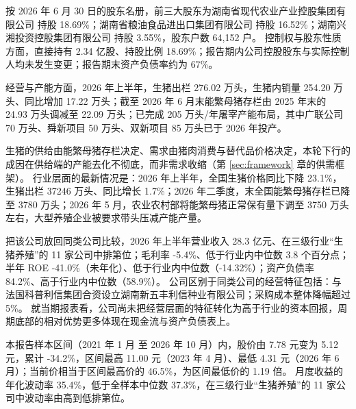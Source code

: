  按 2026 年 6 月 30 日的股东名册，前三大股东为湖南省现代农业产业控股集团有限公司 持股 18.69\%；湖南省粮油食品进出口集团有限公司 持股 16.52\%；湖南兴湘投资控股集团有限公司 持股 3.55\%，股东户数 64,152 户。 控制权与股东性质方面，直接持有 2.34 亿股、持股比例 18.69\%；报告期内公司控股股东与实际控制人均未发生变更；报告期末资产负债率约为 67\%。

 经营与产能方面，2026 年上半年，生猪出栏 276.02 万头，生猪内销量 254.20 万头、同比增加 17.22 万头；截至 2026 年 6 月末能繁母猪存栏由 2025 年末的 24.93 万头调减至 22.09 万头；已完成 205 万头/年屠宰产能布局，其中广联公司 70 万头、舜新项目 50 万头、双新项目 85 万头已于 2026 年投产。

 生猪的供给由能繁母猪存栏决定、需求由猪肉消费与替代品价格决定，本轮下行的成因在供给端的产能去化不彻底，而非需求收缩（第 \ref{sec:framework} 章的供需框架）。 行业层面的最新情况是：2026 年上半年，全国生猪价格同比下降 23.1\%，生猪出栏 37246 万头、同比增长 1.7\%；2026 年二季度，末全国能繁母猪存栏已降至 3780 万头；2026 年 5 月，农业农村部将能繁母猪正常保有量下调至 3750 万头左右，大型养殖企业被要求带头压减产能产量。

 把该公司放回同类公司比较，2026 年上半年营业收入 28.3 亿元、在三级行业“生猪养殖”的 11 家公司中排第位；毛利率 -5.4\%、低于行业内中位数 3.8 个百分点；半年 ROE -41.0\%（未年化）、低于行业内中位数（-14.32\%）；资产负债率 84.2\%、高于行业内中位数（58.9\%）。 公司区别于同类公司的经营特征包括：与法国科普利信集团合资设立湖南新五丰利信种业有限公司；采购成本整体降幅超过 5\%。 就当期报表看，公司尚未把经营层面的特征转化为高于行业的资本回报，周期底部的相对优势更多体现在现金流与资产负债表上。

 本报告样本区间（2021 年 1 月 至 2026 年 10 月）内，股价由 7.78 元变为 5.12 元，累计 -34.2\%，区间最高 11.00 元（2023 年 4 月）、最低 4.31 元（2026 年 6 月）；当前价相当于区间最高价的 46.5\%，为区间最低价的 1.19 倍。 月度收益的年化波动率 35.4\%，低于全样本中位数 37.3\%，在三级行业“生猪养殖”的 11 家公司中波动率由高到低排第位。

